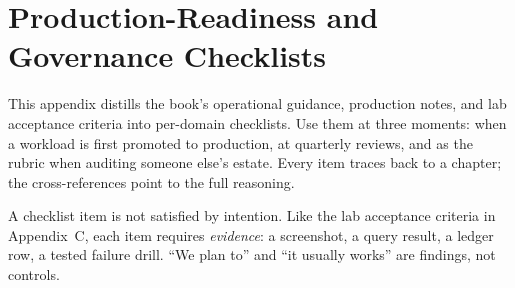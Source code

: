 \chapter{Production-Readiness and Governance Checklists}
%
This appendix distills the book's operational guidance, production notes, and lab acceptance
criteria into per-domain checklists. Use them at three moments: when a workload is first
promoted to production, at quarterly reviews, and as the rubric when auditing someone else's
estate. Every item traces back to a chapter; the cross-references point to the full reasoning.

\begin{notebox}
A checklist item is not satisfied by intention. Like the lab acceptance criteria in
Appendix~C, each item requires \emph{evidence}: a screenshot, a query result, a ledger row, a
tested failure drill. ``We plan to'' and ``it usually works'' are findings, not controls.
\end{notebox}

